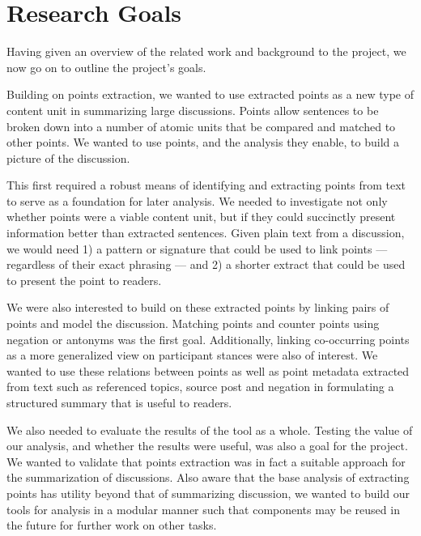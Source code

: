 \chapter{Research Goals\label{chap:res-goals}}
  Having given an overview of the related work and background to the project, we now go on to outline the project's goals.

  Building on points extraction, we wanted to use extracted points as a new type of content unit in summarizing large discussions. Points allow sentences to be broken down into a number of atomic units that be compared and matched to other points. We wanted to use points, and the analysis they enable, to build a picture of the discussion.

  This first required a robust means of identifying and extracting points from text to serve as a foundation for later analysis. We needed to investigate not only whether points were a viable content unit, but if they could succinctly present information better than extracted sentences. Given plain text from a discussion, we would need 1) a pattern or signature that could be used to link points --- regardless of their exact phrasing --- and 2) a shorter extract that could be used to present the point to readers.

  We were also interested to build on these extracted points by linking pairs of points and model the discussion. Matching points and counter points using negation or antonyms was the first goal. Additionally, linking co-occurring points as a more generalized view on participant stances were also of interest. We wanted to use these relations between points as well as point metadata extracted from text such as referenced topics, source post and negation in formulating a structured summary that is useful to readers.

  We also needed to evaluate the results of the tool as a whole. Testing the value of our analysis, and whether the results were useful, was also a goal for the project. We wanted to validate that points extraction was in fact a suitable approach for the summarization of discussions. Also aware that the base analysis of extracting points has utility beyond that of summarizing discussion, we wanted to build our tools for analysis in a modular manner such that components may be reused in the future for further work on other tasks.
